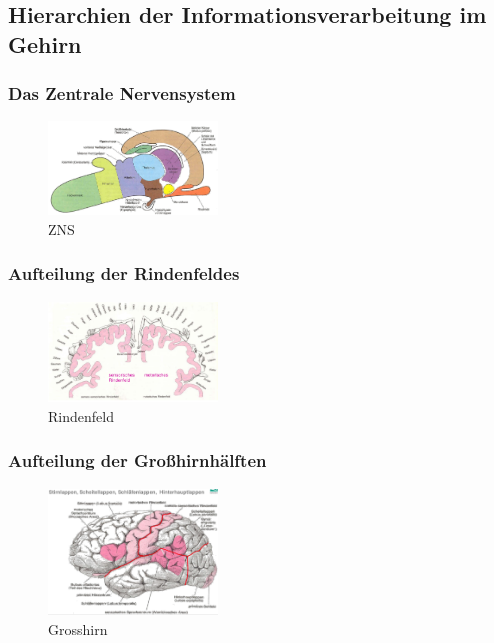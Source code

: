\subsection{Hierarchien der Informationsverarbeitung im Gehirn}
\subsubsection{Das Zentrale Nervensystem}
\begin{figure}[h!]
	\centering
	\includegraphics[width=0.4\textwidth]{figures/ch07_zns.png}
	\caption{ZNS}
	\label{zns}
\end{figure}
\subsubsection{Aufteilung der Rindenfeldes}
\begin{figure}[h!]
	\centering
	\includegraphics[width=0.4\textwidth]{figures/ch07_rindenfeld.png}
	\caption{Rindenfeld}
	\label{rindenfeld}
\end{figure}
\subsubsection{Aufteilung der Großhirnhälften}
\begin{figure}[h!]
	\centering
	\includegraphics[width=0.4\textwidth]{figures/ch07_grosshirn.png}
	\caption{Grosshirn}
	\label{grosshirn}
\end{figure}
